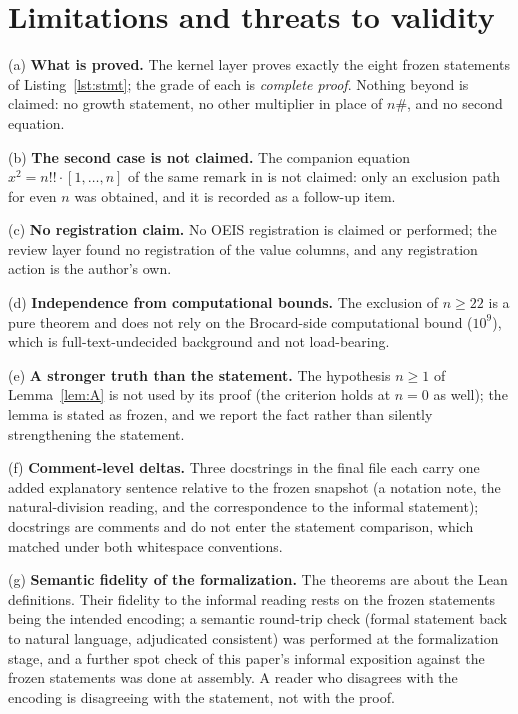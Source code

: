 \documentclass[11pt]{article}
\theoremstyle{definition}
\begin{document}
\section{Limitations and threats to validity}\label{sec:limits}

(a) \textbf{What is proved.} The kernel layer proves exactly the eight frozen
statements of Listing~\ref{lst:stmt}; the grade of each is \emph{complete
proof}. Nothing beyond is claimed: no growth statement, no other multiplier
in place of $n\#$, and no second equation.

(b) \textbf{The second case is not claimed.} The companion equation
$x^2 = n!! \cdot [1, \ldots, n]$ of the same remark in \cite{novakovic2026}
is not claimed: only an exclusion path for even $n$ was obtained, and it is
recorded as a follow-up item.

(c) \textbf{No registration claim.} No OEIS registration is claimed or
performed; the review layer found no registration of the value columns, and
any registration action is the author's own.

(d) \textbf{Independence from computational bounds.} The exclusion of
$n \ge 22$ is a pure theorem and does not rely on the Brocard-side
computational bound ($10^{9}$), which is full-text-undecided background and
not load-bearing.

(e) \textbf{A stronger truth than the statement.} The hypothesis $n \ge 1$ of
Lemma~\ref{lem:A} is not used by its proof (the criterion holds at $n = 0$ as
well); the lemma is stated as frozen, and we report the fact rather than
silently strengthening the statement.

(f) \textbf{Comment-level deltas.} Three docstrings in the final file each
carry one added explanatory sentence relative to the frozen snapshot (a
notation note, the natural-division reading, and the correspondence to the
informal statement); docstrings are comments and do not enter the statement
comparison, which matched under both whitespace conventions.

(g) \textbf{Semantic fidelity of the formalization.} The theorems are about
the Lean definitions. Their fidelity to the informal reading rests on the
frozen statements being the intended encoding; a semantic round-trip check
(formal statement back to natural language, adjudicated consistent) was
performed at the formalization stage, and a further spot check of this
paper's informal exposition against the frozen statements was done at
assembly. A reader who disagrees with the encoding is disagreeing with the
statement, not with the proof.
\end{document}
